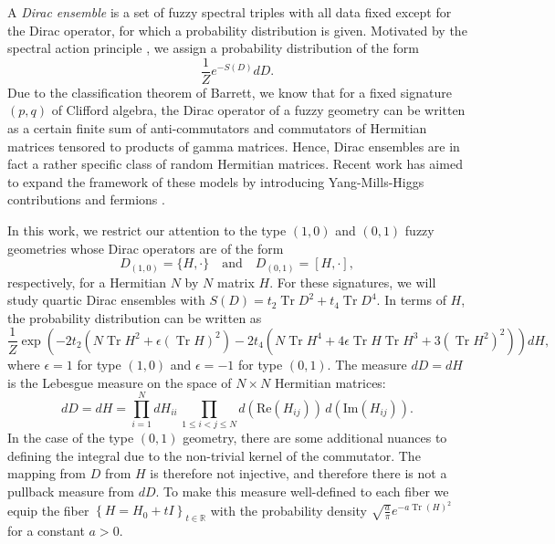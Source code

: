 \documentclass[10pt]{article}
\theoremstyle{plain}
\theoremstyle{definition}
\DeclareMathOperator{\tr}{Tr}
\theoremstyle{plain}
\begin{document}
A \textit{Dirac ensemble} is a set of fuzzy spectral triples with all data fixed except for the Dirac operator, for which a probability distribution is given. Motivated by the spectral action principle \cite{connes1996gravity}, we assign a probability distribution of the form
\begin{equation*}
 \frac{1}{Z} e^{-S(D)}dD.
\end{equation*}
Due to the classification theorem of Barrett\cite{barrett2015matrix}, we know that for a fixed signature $(p,q)$ of Clifford algebra, the Dirac operator of a fuzzy geometry can be written as a certain finite sum of anti-commutators and commutators of Hermitian matrices tensored to products of gamma matrices. Hence, Dirac ensembles are in fact a rather specific class of random Hermitian matrices. Recent work has aimed to expand the framework of these models by introducing Yang-Mills-Higgs contributions \cite{perez2022multimatrix} and fermions \cite{barrett2024fermion,khalkhali2025large}.

 In this work, we restrict our attention to the type $(1,0)$ and $(0,1)$ fuzzy geometries whose Dirac operators are of the form 
		$$D_{(1,0)} = \{H,\cdot\} \quad \text{and}\quad D_{(0,1)} = [H,\cdot],$$
		respectively, for a Hermitian $N$ by $N$ matrix $H$.
For these signatures, we will study quartic Dirac ensembles with $S(D)=t_{2}\tr D^2 + t_{4}\tr D^{4}$. In terms of $H$, the probability distribution can be written as 
\begin{equation} \label{action}
 \frac{1}{Z} \exp\left(-2t_{2}( N\tr H^2 +\epsilon(\tr H)^2) -2t_{4}(N \tr H^{4} +4 \epsilon \tr H \tr H^3 + 3(\tr H^2)^2)\right)dH,
\end{equation}
where $\epsilon =1$ for type $(1,0)$ and $\epsilon =-1$ for type $(0,1)$. The measure $dD=dH$ is the Lebesgue measure on the space of $N \times N$ Hermitian matrices:
		\begin{equation*}
		d D = d H = \prod_{i=1}^N d H_{ii} \, \prod_{1 \leq i < j \leq N} d ({\text{Re}} (H_{ij})) \, d ({\text{Im}} (H_{ij})). 
		\end{equation*}
In the case of the type $(0,1)$ geometry, there are some additional nuances to defining the integral due to the non-trivial kernel of the commutator. The mapping from $D$ from $H$ is therefore not injective, and therefore there is not a pullback measure from $dD$. To make this measure well-defined to each fiber we equip the fiber $\left\{H=H_0+t I\right\}_{t \in \mathbb{R}}$ with the probability density $\sqrt{\frac{a}{\pi}} e^{-a \operatorname{Tr}(H)^2}$ for a constant $a>0$.
\end{document}
